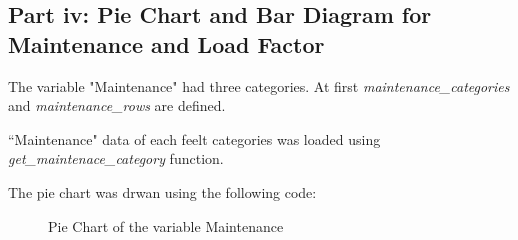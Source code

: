 \subsection{Part iv: Pie Chart and Bar Diagram for Maintenance and Load Factor}
The variable "Maintenance" had three categories. At first \textit{maintenance\_categories} and \textit{maintenance\_rows} are defined.


``Maintenance" data of each feelt categories was loaded using \textit{get\_maintenace\_category} function.


The pie chart was drwan using the following code:



\begin{figure}[H]
    \centering


    \caption{Pie Chart of the variable Maintenance}
\end{figure}


